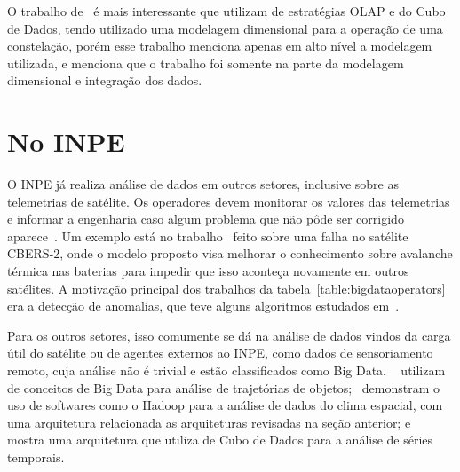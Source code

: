 O trabalho de~\cite{yvernesCopernicusGroundSegment2018} é mais interessante que utilizam de estratégias OLAP e do Cubo de Dados, tendo utilizado uma modelagem dimensional para a operação de uma constelação, porém esse trabalho menciona apenas em alto nível a modelagem utilizada, e menciona que o trabalho foi somente na parte da modelagem dimensional e integração dos dados.

\section{No INPE}
\label{ch:corr:inpe}

O INPE já realiza análise de dados em outros setores, inclusive sobre as telemetrias de satélite.
Os operadores devem monitorar os valores das telemetrias e informar a engenharia caso algum problema que não pôde ser corrigido aparece~\cite{TominagaFerrAmbr:2017:CoSaTe}.
Um exemplo está no trabalho~\cite{Magalhaes:2012:EsAvTe} feito sobre uma falha no satélite CBERS-2, onde o modelo proposto visa melhorar o conhecimento sobre avalanche térmica nas baterias para impedir que isso aconteça novamente em outros satélites.
A motivação principal dos trabalhos da tabela~\ref{table:bigdataoperators} era a detecção de anomalias, que teve alguns algoritmos estudados em~\cite{AzevedoAmbrViei::EsSoTe}.

Para os outros setores, isso comumente se dá na análise de dados vindos da carga útil do satélite ou de agentes externos ao INPE, como dados de sensoriamento remoto, cuja análise não é trivial e estão classificados como Big Data.
~\cite{monteiroFRAMEWORKTRAJECTORYDATA2017} utilizam de conceitos de Big Data para análise de trajetórias de objetos;~\cite{ramosDistributedSystemsPerformance2016} demonstram o uso de softwares como o Hadoop para a análise de dados do clima espacial, com uma arquitetura relacionada as arquiteturas revisadas na seção anterior; e~\cite{SimoesCamaQuei:2018:DaAnMa} mostra uma arquitetura que utiliza de Cubo de Dados para a análise de séries temporais.

